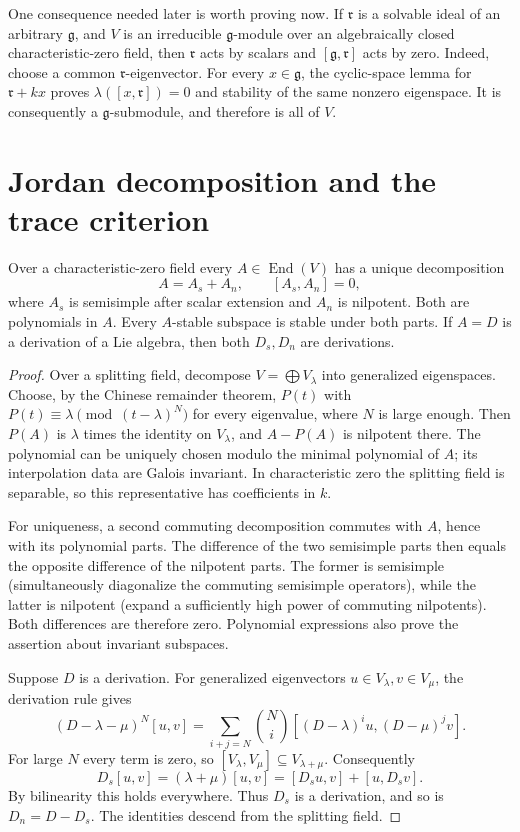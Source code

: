 One consequence needed later is worth proving now. If
\(\mathfrak r\) is a solvable ideal of an arbitrary
\(\mathfrak g\), and \(V\) is an irreducible
\(\mathfrak g\)-module over an algebraically closed
characteristic-zero field, then \(\mathfrak r\) acts by
scalars and \([\mathfrak g,\mathfrak r]\) acts by zero.
Indeed, choose a common \(\mathfrak r\)-eigenvector.
For every \(x\in\mathfrak g\), the cyclic-space lemma for
\(\mathfrak r+kx\) proves
\(\lambda([x,\mathfrak r])=0\) and stability of the same
nonzero eigenspace. It is consequently a
\(\mathfrak g\)-submodule, and therefore is all of \(V\).

\section{Jordan decomposition and the trace criterion}

\begin{proposition}
\label{res:B03}
Over a characteristic-zero field every \(A\in\operatorname{End}(V)\)
has a unique decomposition
\[
 A=A_s+A_n,\qquad [A_s,A_n]=0,
\]
where \(A_s\) is semisimple after scalar extension and
\(A_n\) is nilpotent. Both are polynomials in \(A\).
Every \(A\)-stable subspace is stable under both parts.
If \(A=D\) is a derivation of a Lie algebra, then both
\(D_s,D_n\) are derivations.
\end{proposition}

\begin{proof}
Over a splitting field, decompose \(V=\bigoplus V_\lambda\)
into generalized eigenspaces. Choose, by the Chinese
remainder theorem, \(P(t)\) with
\(P(t)\equiv\lambda\pmod{(t-\lambda)^N}\) for every
eigenvalue, where \(N\) is large enough.
Then \(P(A)\) is \(\lambda\) times the identity on
\(V_\lambda\), and \(A-P(A)\) is nilpotent there.
The polynomial can be uniquely chosen modulo the minimal
polynomial of \(A\); its interpolation data are Galois
invariant. In characteristic zero the splitting field is
separable, so this representative has coefficients in \(k\).

For uniqueness, a second commuting decomposition commutes
with \(A\), hence with its polynomial parts. The difference
of the two semisimple parts then equals the opposite
difference of the nilpotent parts. The former is
semisimple (simultaneously diagonalize the commuting
semisimple operators), while the latter is nilpotent
(expand a sufficiently high power of commuting nilpotents).
Both differences are therefore zero. Polynomial expressions
also prove the assertion about invariant subspaces.

Suppose \(D\) is a derivation. For generalized eigenvectors
\(u\in V_\lambda,v\in V_\mu\), the derivation rule gives
\[
 (D-\lambda-\mu)^N[u,v]
 =\sum_{i+j=N}\binom Ni[(D-\lambda)^iu,(D-\mu)^jv].
\]
For large \(N\) every term is zero, so
\([V_\lambda,V_\mu]\subseteq V_{\lambda+\mu}\).
Consequently
\[
 D_s[u,v]=(\lambda+\mu)[u,v]
          =[D_su,v]+[u,D_sv].
\]
By bilinearity this holds everywhere. Thus \(D_s\) is a
derivation, and so is \(D_n=D-D_s\). The identities descend
from the splitting field.
\end{proof}

